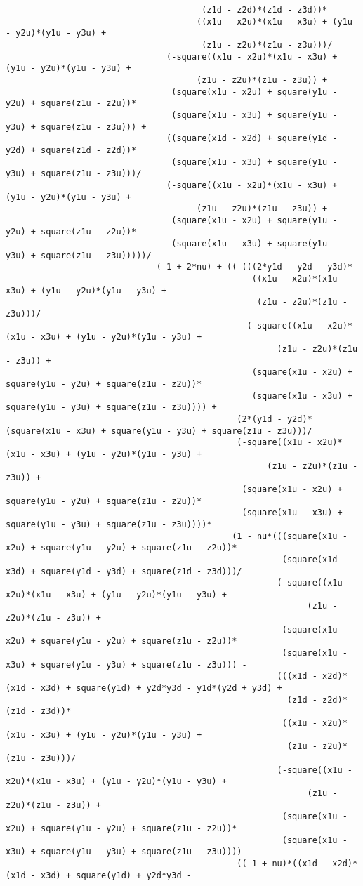 \begin{lstlisting}
									   (z1d - z2d)*(z1d - z3d))*
									  ((x1u - x2u)*(x1u - x3u) + (y1u - y2u)*(y1u - y3u) + 
									   (z1u - z2u)*(z1u - z3u)))/
								(-square((x1u - x2u)*(x1u - x3u) + (y1u - y2u)*(y1u - y3u) + 
									  (z1u - z2u)*(z1u - z3u)) + 
								 (square(x1u - x2u) + square(y1u - y2u) + square(z1u - z2u))*
								 (square(x1u - x3u) + square(y1u - y3u) + square(z1u - z3u))) + 
								((square(x1d - x2d) + square(y1d - y2d) + square(z1d - z2d))*
								 (square(x1u - x3u) + square(y1u - y3u) + square(z1u - z3u)))/
								(-square((x1u - x2u)*(x1u - x3u) + (y1u - y2u)*(y1u - y3u) + 
									  (z1u - z2u)*(z1u - z3u)) + 
								 (square(x1u - x2u) + square(y1u - y2u) + square(z1u - z2u))*
								 (square(x1u - x3u) + square(y1u - y3u) + square(z1u - z3u)))))/
							  (-1 + 2*nu) + ((-(((2*y1d - y2d - y3d)*
												 ((x1u - x2u)*(x1u - x3u) + (y1u - y2u)*(y1u - y3u) + 
												  (z1u - z2u)*(z1u - z3u)))/
												(-square((x1u - x2u)*(x1u - x3u) + (y1u - y2u)*(y1u - y3u) + 
													  (z1u - z2u)*(z1u - z3u)) + 
												 (square(x1u - x2u) + square(y1u - y2u) + square(z1u - z2u))*
												 (square(x1u - x3u) + square(y1u - y3u) + square(z1u - z3u)))) + 
											  (2*(y1d - y2d)*(square(x1u - x3u) + square(y1u - y3u) + square(z1u - z3u)))/
											  (-square((x1u - x2u)*(x1u - x3u) + (y1u - y2u)*(y1u - y3u) + 
													(z1u - z2u)*(z1u - z3u)) + 
											   (square(x1u - x2u) + square(y1u - y2u) + square(z1u - z2u))*
											   (square(x1u - x3u) + square(y1u - y3u) + square(z1u - z3u))))*
											 (1 - nu*(((square(x1u - x2u) + square(y1u - y2u) + square(z1u - z2u))*
													   (square(x1d - x3d) + square(y1d - y3d) + square(z1d - z3d)))/
													  (-square((x1u - x2u)*(x1u - x3u) + (y1u - y2u)*(y1u - y3u) + 
															(z1u - z2u)*(z1u - z3u)) + 
													   (square(x1u - x2u) + square(y1u - y2u) + square(z1u - z2u))*
													   (square(x1u - x3u) + square(y1u - y3u) + square(z1u - z3u))) - 
													  (((x1d - x2d)*(x1d - x3d) + square(y1d) + y2d*y3d - y1d*(y2d + y3d) + 
														(z1d - z2d)*(z1d - z3d))*
													   ((x1u - x2u)*(x1u - x3u) + (y1u - y2u)*(y1u - y3u) + 
														(z1u - z2u)*(z1u - z3u)))/
													  (-square((x1u - x2u)*(x1u - x3u) + (y1u - y2u)*(y1u - y3u) + 
															(z1u - z2u)*(z1u - z3u)) + 
													   (square(x1u - x2u) + square(y1u - y2u) + square(z1u - z2u))*
													   (square(x1u - x3u) + square(y1u - y3u) + square(z1u - z3u)))) - 
											  ((-1 + nu)*((x1d - x2d)*(x1d - x3d) + square(y1d) + y2d*y3d - 

\end{lstlisting}
